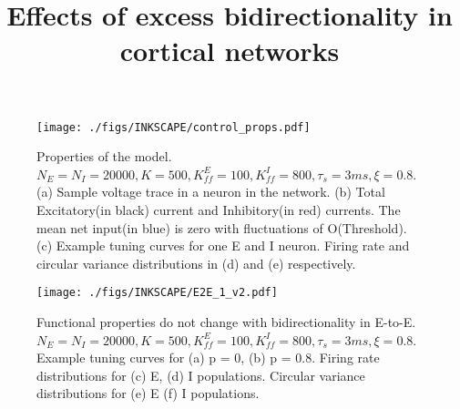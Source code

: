 \documentclass[10pt, a4paper, twocolumn]{article}
\title{Effects of excess bidirectionality in cortical networks}
\date{}
\begin{document}
\maketitle
\begin{@twocolumnfalse}
    \maketitle
    \begin{abstract}
    \end{abstract}
  \end{@twocolumnfalse}






\newpage
\begin{small}


\end{small}

\newpage
\begin{figure*}
\centering
\texttt{[image: ./figs/INKSCAPE/control\_props.pdf]}
\caption{\small{Properties of the model. $N_E = N_I = 20000, K = 500, K_{ff}^E = 100, K_{ff}^I = 800, \tau_s = 3ms, \xi = 0.8$. (a) Sample voltage trace in a neuron in the network. (b) Total Excitatory(in black) current and Inhibitory(in red) currents. The mean net input(in blue) is zero with fluctuations of O(Threshold). (c) Example tuning curves for one E and I neuron. Firing rate and circular variance distributions in (d) and (e) respectively.}}
\label{fig:control}
\end{figure*}



\begin{figure*}
\centering
\texttt{[image: ./figs/INKSCAPE/E2E\_1\_v2.pdf]}
\caption{\small{Functional properties do not change with bidirectionality in E-to-E. $N_E = N_I = 20000, K = 500, K_{ff}^E = 100, K_{ff}^I = 800, \tau_s = 3ms, \xi = 0.8$. Example tuning curves for (a) p = 0, (b) p = 0.8. Firing rate distributions for (c) E, (d) I populations. Circular variance distributions for (e) E (f) I populations.}}
\label{fig:e2e1}
\end{figure*}
\end{document}
